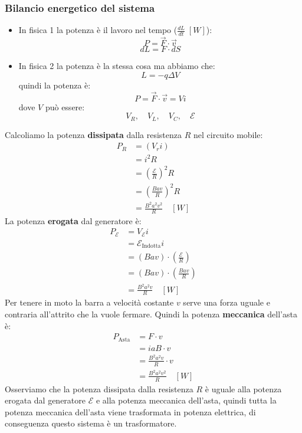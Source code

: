 \documentclass[a4paper]{article}
\begin{document}
\subsubsection{Bilancio energetico del sistema}
\begin{itemize}
  \item In fisica 1 la potenza è il lavoro nel tempo
    (\( \frac{dL}{dt} \; \left[ W \right] \)):
    \[
      P = \vec{F} \cdot \vec{v}
    \]
    \[
      dL = F \cdot dS
    \] 

  \item In fisica 2 la potenza è la stessa cosa ma abbiamo che:
    \[
      L = -q \Delta V
    \] 
    quindi la potenza è:
    \[
      P = \vec{F} \cdot \vec{v} = Vi
    \] 
    dove \( V \) può essere:
    \[
      V_R, \quad V_L, \quad V_C, \quad \mathcal{E}
    \] 
\end{itemize}
Calcoliamo la potenza \textbf{dissipata} dalla resistenza \( R \) nel circuito mobile:
\[
  \begin{aligned}
    P_R &= (V_r i)\\
        &= i^2 R\\
        &= \left( \frac{\mathcal{E}}{R} \right)^2 R\\
        &= \left( \frac{Bav}{R} \right)^2 R\\
        &= \frac{B^2 a^2 v^2}{R} \quad \left[ W \right]
  \end{aligned}
\] 
La potenza \textbf{erogata} dal generatore è:
\[
  \begin{aligned}
    P_{\mathcal{E}} &= V_{\mathcal{E}} i \\
                    &= \mathcal{E}_{\text{Indotta}} i \\
                    &= (Bav) \cdot (\frac{\mathcal{E}}{R})\\
                    &= (Bav) \cdot (\frac{Bav}{R})\\
                    &= \frac{B^2 a^2 v}{R} \quad \left[ W \right]
  \end{aligned}
\] 
Per tenere in moto la barra a velocità costante \( v \) serve una forza uguale e contraria
all'attrito che la vuole fermare. Quindi la potenza \textbf{meccanica} dell'asta è:
\[
  \begin{aligned}
    P_{\text{Asta}} &= F \cdot v\\
                    &= iaB \cdot v\\
                    &= \frac{B^2 a^2 v}{R} \cdot v\\
                    &= \frac{B^2 a^2 v^2}{R} \quad \left[ W \right]
  \end{aligned}
\] 
Osserviamo che la potenza dissipata dalla resistenza \( R \) è uguale alla potenza
erogata dal generatore \( \mathcal{E} \) e alla potenza meccanica dell'asta, quindi
tutta la potenza meccanica dell'asta viene trasformata in potenza elettrica, di conseguenza
questo sistema è un trasformatore.
\end{document}
